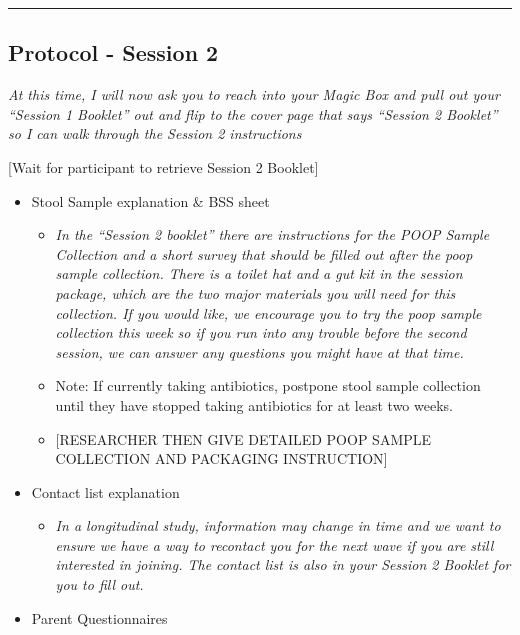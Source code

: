 \documentclass[]{book}
\providecommand{\tightlist}{%
  \setlength{\itemsep}{0pt}\setlength{\parskip}{0pt}}
\begin{document}
\begin{center}\rule{0.5\linewidth}{0.5pt}\end{center}

\hypertarget{protocol---session-2}{%
\subsection{Protocol - Session 2}\label{protocol---session-2}}

\emph{At this time, I will now ask you to reach into your Magic Box and pull out your ``Session 1 Booklet'' out and flip to the cover page that says ``Session 2 Booklet'' so I can walk through the Session 2 instructions}

{[}Wait for participant to retrieve Session 2 Booklet{]}

\begin{itemize}
\tightlist
\item
  Stool Sample explanation \& BSS sheet

  \begin{itemize}
  \item
    \emph{In the ``Session 2 booklet'' there are instructions for the POOP Sample Collection and a short survey that should be filled out after the poop sample collection. There is a toilet hat and a gut kit in the session package, which are the two major materials you will need for this collection. If you would like, we encourage you to try the poop sample collection this week so if you run into any trouble before the second session, we can answer any questions you might have at that time.}
  \item
    Note: If currently taking antibiotics, postpone stool sample collection until they have stopped taking antibiotics for at least two weeks.
  \item
    {[}RESEARCHER THEN GIVE DETAILED POOP SAMPLE COLLECTION AND PACKAGING INSTRUCTION{]}
  \end{itemize}
\item
  Contact list explanation

  \begin{itemize}
  \tightlist
  \item
    \emph{In a longitudinal study, information may change in time and we want to ensure we have a way to recontact you for the next wave if you are still interested in joining. The contact list is also in your Session 2 Booklet for you to fill out.}
  \end{itemize}
\item
  Parent Questionnaires


\end{itemize}
\end{document}
